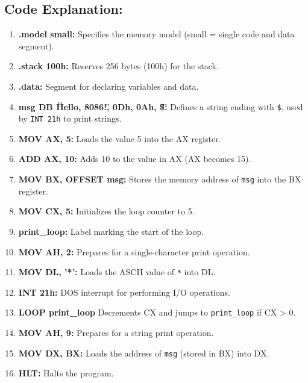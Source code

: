 \documentclass[a4paper,12pt]{article}
\begin{document}
\subsection*{Code Explanation:}
\begin{enumerate}
    \item \textbf{.model small:} Specifies the memory model (small = single code and data segment).
    \item \textbf{.stack 100h:} Reserves 256 bytes (100h) for the stack.
    \item \textbf{.data:} Segment for declaring variables and data.
    \item \textbf{msg DB \"Hello, 8086!\", 0Dh, 0Ah, \"\$\":} Defines a string ending with \texttt{\$}, used by \texttt{INT 21h} to print strings.
    \item \textbf{MOV AX, 5:} Loads the value 5 into the AX register.
    \item \textbf{ADD AX, 10:} Adds 10 to the value in AX (AX becomes 15).
    \item \textbf{MOV BX, OFFSET msg:} Stores the memory address of \texttt{msg} into the BX register.
    \item \textbf{MOV CX, 5:} Initializes the loop counter to 5.
    \item \textbf{print\_loop:} Label marking the start of the loop.
    \item \textbf{MOV AH, 2:} Prepares for a single-character print operation.
    \item \textbf{MOV DL, '*':} Loads the ASCII value of \texttt{*} into DL.
    \item \textbf{INT 21h:} DOS interrupt for performing I/O operations.
    \item \textbf{LOOP print\_loop\:} Decrements CX and jumps to \texttt{print\_loop} if CX > 0.
    \item \textbf{MOV AH, 9:} Prepares for a string print operation.
    \item \textbf{MOV DX, BX:} Loads the address of \texttt{msg} (stored in BX) into DX.
    \item \textbf{HLT:} Halts the program.
\end{enumerate}
\end{document}
